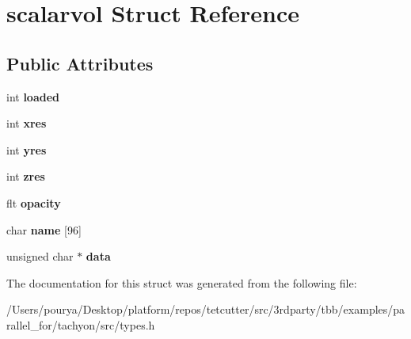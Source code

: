 \hypertarget{structscalarvol}{}\section{scalarvol Struct Reference}
\label{structscalarvol}
\subsection*{Public Attributes}
\begin{DoxyCompactItemize}
\item 
\hypertarget{structscalarvol_acd11fd8692f6c1f5ff5c93aee3276428}{}int {\bfseries loaded}\label{structscalarvol_acd11fd8692f6c1f5ff5c93aee3276428}

\item 
\hypertarget{structscalarvol_a4adc69d960d833471d6060f0e92cf2b5}{}int {\bfseries xres}\label{structscalarvol_a4adc69d960d833471d6060f0e92cf2b5}

\item 
\hypertarget{structscalarvol_afc07eee3071605eef1acaf9175648489}{}int {\bfseries yres}\label{structscalarvol_afc07eee3071605eef1acaf9175648489}

\item 
\hypertarget{structscalarvol_a488e14b89755f4e9d89c906e62302900}{}int {\bfseries zres}\label{structscalarvol_a488e14b89755f4e9d89c906e62302900}

\item 
\hypertarget{structscalarvol_a5cacfc55e518e7e7bc8ac5b757308532}{}flt {\bfseries opacity}\label{structscalarvol_a5cacfc55e518e7e7bc8ac5b757308532}

\item 
\hypertarget{structscalarvol_aeb580b249ac78b0fffd359c1c618f69a}{}char {\bfseries name} \mbox{[}96\mbox{]}\label{structscalarvol_aeb580b249ac78b0fffd359c1c618f69a}

\item 
\hypertarget{structscalarvol_a06b58d171f32ed494846702321e0b460}{}unsigned char $\ast$ {\bfseries data}\label{structscalarvol_a06b58d171f32ed494846702321e0b460}

\end{DoxyCompactItemize}


The documentation for this struct was generated from the following file\+:\begin{DoxyCompactItemize}
\item 
/\+Users/pourya/\+Desktop/platform/repos/tetcutter/src/3rdparty/tbb/examples/parallel\+\_\+for/tachyon/src/types.\+h\end{DoxyCompactItemize}
